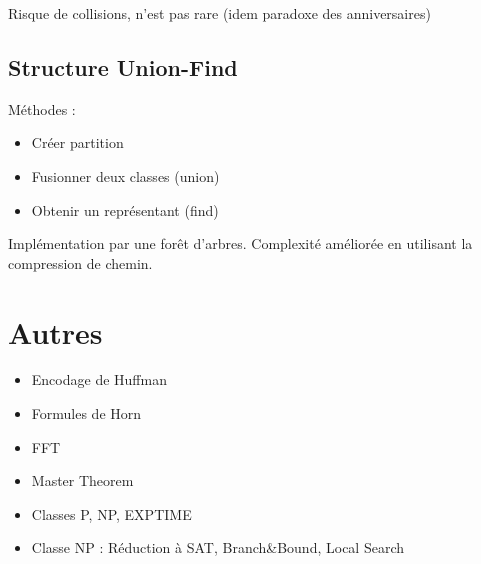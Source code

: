 \documentclass[10pt,a4paper]{article}
\begin{document}
Risque de collisions, n'est pas rare (idem paradoxe des anniversaires)

\subsection{Structure Union-Find}

Méthodes : 
\begin{itemize}[noitemsep]
	\item Créer partition
	\item Fusionner deux classes (union)
	\item Obtenir un représentant (find)
\end{itemize}

Implémentation par une forêt d'arbres. %
Complexité améliorée en utilisant la compression de chemin.




\section{Autres}

\begin{itemize}[noitemsep]
	\item Encodage de Huffman
	\item Formules de Horn
	\item FFT
	\item Master Theorem
	\item Classes P, NP, EXPTIME
	\item Classe NP : Réduction à SAT, Branch\&Bound, Local Search
\end{itemize}
\end{document}
